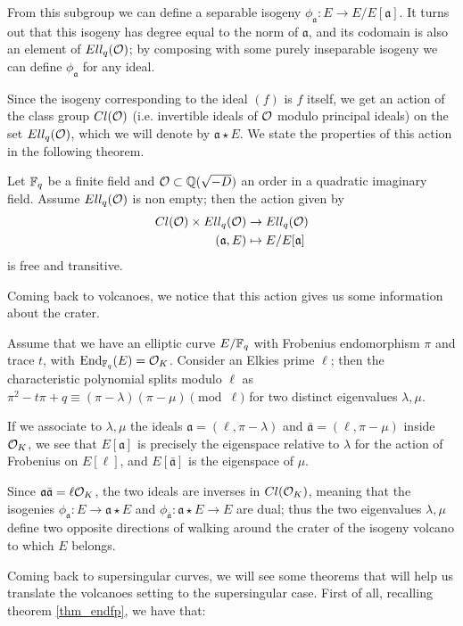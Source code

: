 From this subgroup we can define a separable isogeny $\phi_{\mathfrak{a}}: E\to E/E[\mathfrak{a}]$. It turns out that this isogeny has degree equal to the norm of $\mathfrak{a}$, and its codomain is also an element of $Ell_q(\mathcal{O})$; by composing with some purely inseparable isogeny we can define $\phi_{\mathfrak{a}}$ for any ideal.

Since the isogeny corresponding to the ideal $(f)$ is $f$ itself, we get an action of the class group $Cl(\mathcal{O})$ (i.e. invertible ideals of $\mathcal{O}$ modulo principal ideals) on the set $Ell_q(\mathcal{O})$, which we will denote by $\mathfrak{a}\star E$. We state the properties of this action in the following theorem.

\begin{theorem}
    Let $\mathbb{F}_q$ be a finite field and $\mathcal{O}\subset\mathbb{Q}(\sqrt{-D})$ an order in a quadratic imaginary field. Assume $Ell_q(\mathcal{O})$ is non empty; then the action given by
    \begin{align*}
    Cl(\mathcal{O})\times Ell_q(\mathcal{O}) & \to  Ell_q(\mathcal{O})\\
    (\mathfrak{a}, E) & \mapsto  E/E[\mathfrak{a}]
    \end{align*}
    is free and transitive.
\end{theorem}

Coming back to volcanoes, we notice that this action gives us some information about the crater.

Assume that we have an elliptic curve $E/\mathbb{F}_q$ with Frobenius endomorphism $\pi$ and trace $t$, with $\operatorname{End}_{\mathbb{F}_q}(E)=\mathcal{O}_K$. Consider an Elkies prime $\ell$; then the characteristic polynomial splits modulo $\ell$ as $\pi^2-t\pi+q\equiv(\pi-\lambda)(\pi-\mu)\pmod\ell$ for two distinct eigenvalues $\lambda,\mu$.

If we associate to $\lambda,\mu$ the ideals $\mathfrak{a}=(\ell,\pi-\lambda)$ and $\bar{\mathfrak{a}}=(\ell,\pi-\mu)$ inside $\mathcal{O}_K$, we see that $E[\mathfrak{a}]$ is precisely the eigenspace relative to $\lambda$ for the action of Frobenius on $E[\ell]$, and $E[\bar{\mathfrak{a}}]$ is the eigenspace of $\mu$.

Since $\mathfrak{a}\bar{\mathfrak{a}}=\ell\mathcal{O}_K$, the two ideals are inverses in $Cl(\mathcal{O}_K)$, meaning that the isogenies $\phi_{\mathfrak{a}}:E\to \mathfrak{a}\star E$ and $\phi_{\bar{\mathfrak{a}}}:\mathfrak{a}\star E\to E$ are dual; thus the two eigenvalues $\lambda,\mu$ define two opposite directions of walking around the crater of the isogeny volcano to which $E$ belongs.

Coming back to supersingular curves, we will see some theorems that will help us translate the volcanoes setting to the supersingular case. First of all, recalling theorem \ref{thm_endfp}, we have that:

